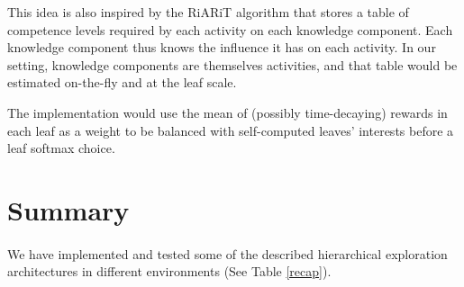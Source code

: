 \documentclass[12pt]{article}
\begin{document}
		This idea is also inspired by the RiARiT algorithm that stores a table of competence levels required by each activity on each knowledge component.
		Each knowledge component thus knows the influence it has on each activity.
		In our setting, knowledge components are themselves activities, and that table would be estimated on-the-fly and at the leaf scale.
		
		The implementation would use the mean of (possibly time-decaying) rewards in each leaf as a weight to be balanced with self-computed leaves' interests before a leaf softmax choice.
		
		
		
		
		

	


%

\section{Summary}

	\paragraph{}%
	We have implemented and tested some of the described hierarchical exploration architectures in different environments (See Table \ref{recap}).
	
\end{document}
